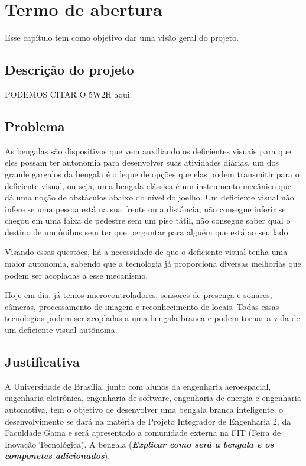 \chapter[Termo de abertura]{Termo de abertura}

Esse capítulo tem como objetivo dar uma visão geral do projeto.

\section{Descrição do projeto}

PODEMOS CITAR O 5W2H aqui.

\section{Problema}

As bengalas são dispositivos que vem auxiliando os deficientes visuais para que eles possam ter autonomia para desenvolver suas atividades diárias, um dos grande gargalos da bengala é o leque de opções que elas podem transmitir para o deficiente visual, ou seja, uma bengala clássica é um instrumento mecânico que dá uma noção de obstáculos abaixo do nível do joelho. Um deficiente visual não infere se uma pessoa está na sua frente ou a distância, não consegue inferir se chegou em uma faixa de pedestre sem um piso tátil, não consegue saber qual o destino de um ônibus sem ter que perguntar para alguém que está ao seu lado.
	
Visando essas questões, há a necessidade de que o deficiente visual tenha uma maior autonomia, sabendo que a tecnologia já proporciona diversas melhorias que podem ser acopladas a esse mecanismo.

Hoje em dia, já temos microcontroladores, sensores de presença e sonares, câmeras, processamento de imagem e reconhecimento de locais. Todas essas tecnologias podem ser acopladas a uma bengala branca e podem tornar a vida de um deficiente visual autônoma. 

\section{Justificativa}

A Universidade de Brasília, junto com alunos da engenharia aeroespacial, engenharia eletrônica, engenharia de software, engenharia de energia e engenharia automotiva, tem o objetivo de desenvolver uma bengala branca inteligente, o desenvolvimento se dará na matéria de Projeto Integrador de Engenharia 2, da Faculdade Gama e será apresentado a comunidade externa na FIT (Feira de Inovação Tecnológica). A bengala (\textbf{\textit{Explicar como será a bengala e os componetes adicionados}}).

